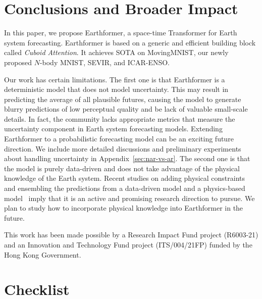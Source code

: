 \documentclass{article}
\def\nbody{$N$-body MNIST}
\begin{document}
\section{Conclusions and Broader Impact}
\label{sec:conclusion}
In this paper, we propose Earthformer, a space-time Transformer for Earth system forecasting. Earthformer is based on a generic and efficient building block called \emph{Cuboid Attention}. It achieves SOTA on MovingMNIST, our newly proposed \nbody{}, SEVIR, and ICAR-ENSO.


Our work has certain limitations.
The first one is that Earthformer is a deterministic model that does not model uncertainty. This may result in predicting the average of all plausible futures, causing the model to generate blurry predictions of low perceptual quality and be lack of valuable small-scale details. In fact, the community lacks appropriate metrics that measure the uncertainty component in Earth system forecasting models. Extending Earthformer to a probabilistic forecasting model can be an exciting future direction.
We include more detailed discussions and preliminary experiments about handling uncertainty in Appendix~\ref{sec:nar-vs-ar}.
The second one is that the model is purely data-driven and does not take advantage of the physical knowledge of the Earth system. Recent studies on adding physical constraints~\cite{krishnapriyan2021characterizing,negiar2022learning} and ensembling the predictions from a data-driven model and a physics-based model~\cite{ravuri2021skilful} imply that it is an active and promising research direction to pursue. We plan to study how to incorporate physical knowledge into Earthformer in the future.






\begin{ack}
This work has been made possible by a Research Impact Fund project (R6003-21) and an Innovation and Technology Fund project (ITS/004/21FP) funded by the Hong Kong Government.
\end{ack}




\newpage
\section*{Checklist}
\end{document}
